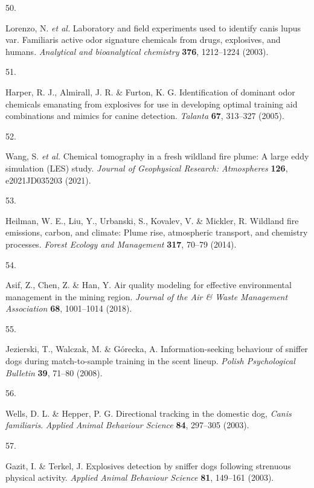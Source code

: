 \documentclass[
]{article}
\newlength{\cslhangindent}
\newlength{\csllabelwidth}
\newlength{\cslentryspacingunit} %
\newenvironment{CSLReferences}[2] %
 {%
  \setlength{\parindent}{0pt}
  \ifodd #1
  \let\oldpar\par
  \def\par{\hangindent=\cslhangindent\oldpar}
  \fi
  \setlength{\parskip}{#2\cslentryspacingunit}
 }%
 {}
\newcommand{\CSLLeftMargin}[1]{\parbox[t]{\csllabelwidth}{#1}}
\newcommand{\CSLRightInline}[1]{\parbox[t]{\linewidth - \csllabelwidth}{#1}\break}
\begin{document}
\begin{CSLReferences}{0}{0}
\leavevmode{}%
\CSLLeftMargin{50. }%
\CSLRightInline{Lorenzo, N. \emph{et al.} Laboratory and field experiments used to identify canis lupus var. Familiaris active odor signature chemicals from drugs, explosives, and humans. \emph{Analytical and bioanalytical chemistry} \textbf{376}, 1212--1224 (2003).}

\leavevmode{}%
\CSLLeftMargin{51. }%
\CSLRightInline{Harper, R. J., Almirall, J. R. \& Furton, K. G. Identification of dominant odor chemicals emanating from explosives for use in developing optimal training aid combinations and mimics for canine detection. \emph{Talanta} \textbf{67}, 313--327 (2005).}

\leavevmode{}%
\CSLLeftMargin{52. }%
\CSLRightInline{Wang, S. \emph{et al.} Chemical tomography in a fresh wildland fire plume: A large eddy simulation (LES) study. \emph{Journal of Geophysical Research: Atmospheres} \textbf{126}, e2021JD035203 (2021).}

\leavevmode{}%
\CSLLeftMargin{53. }%
\CSLRightInline{Heilman, W. E., Liu, Y., Urbanski, S., Kovalev, V. \& Mickler, R. Wildland fire emissions, carbon, and climate: Plume rise, atmospheric transport, and chemistry processes. \emph{Forest Ecology and Management} \textbf{317}, 70--79 (2014).}

\leavevmode{}%
\CSLLeftMargin{54. }%
\CSLRightInline{Asif, Z., Chen, Z. \& Han, Y. Air quality modeling for effective environmental management in the mining region. \emph{Journal of the Air \& Waste Management Association} \textbf{68}, 1001--1014 (2018).}

\leavevmode{}%
\CSLLeftMargin{55. }%
\CSLRightInline{Jezierski, T., Walczak, M. \& Górecka, A. Information-seeking behaviour of sniffer dogs during match-to-sample training in the scent lineup. \emph{Polish Psychological Bulletin} \textbf{39}, 71--80 (2008).}

\leavevmode{}%
\CSLLeftMargin{56. }%
\CSLRightInline{Wells, D. L. \& Hepper, P. G. Directional tracking in the domestic dog, \emph{{C}anis familiaris}. \emph{Applied Animal Behaviour Science} \textbf{84}, 297--305 (2003).}

\leavevmode{}%
\CSLLeftMargin{57. }%
\CSLRightInline{Gazit, I. \& Terkel, J. Explosives detection by sniffer dogs following strenuous physical activity. \emph{Applied Animal Behaviour Science} \textbf{81}, 149--161 (2003).}


\end{CSLReferences}
\end{document}
